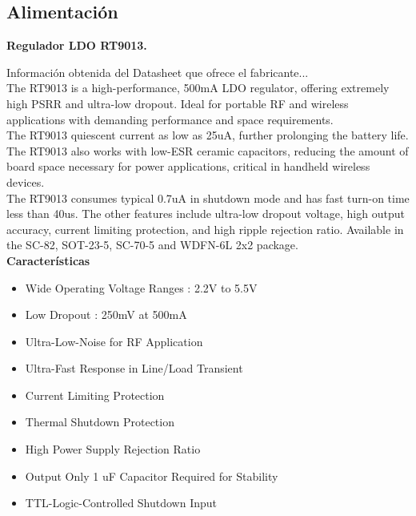 \subsection{Alimentación}

\textbf{Regulador LDO RT9013.}\newline

Información obtenida del Datasheet que ofrece el fabricante...\\

The RT9013 is a high-performance, 500mA LDO regulator, offering extremely high PSRR and ultra-low dropout. Ideal for portable RF and wireless applications with demanding performance and space requirements.\\

The RT9013 quiescent current as low as 25uA, further prolonging the battery life. The RT9013 also works with low-ESR ceramic capacitors, reducing the amount of board space necessary for power applications, critical in handheld wireless devices.\\

The RT9013 consumes typical 0.7uA in shutdown mode and has fast turn-on time less than 40us. The other features include ultra-low dropout voltage, high output accuracy, current limiting protection, and high ripple rejection ratio. Available in the SC-82, SOT-23-5, SC-70-5 and WDFN-6L 2x2 package.\\

\textbf{Características}

\begin{itemize}
    \item Wide Operating Voltage Ranges : 2.2V to 5.5V
    \item Low Dropout : 250mV at 500mA
    \item Ultra-Low-Noise for RF Application
    \item Ultra-Fast Response in Line/Load Transient
    \item Current Limiting Protection
    \item Thermal Shutdown Protection
    \item High Power Supply Rejection Ratio
    \item Output Only 1 uF Capacitor Required for Stability
    \item TTL-Logic-Controlled Shutdown Input
\end{itemize}

\vspace{1cm}

